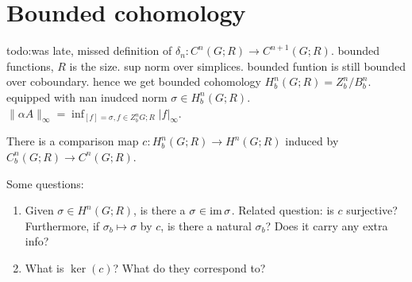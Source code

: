 \section{Bounded cohomology} 
{\color{red}todo:was late, missed definition of $\delta_n  \colon C^n (G;R)  \to C^{n+1}(G;R) $}. bounded functions, $R$ is the size.   sup norm over simplices. bounded funtion is still bounded over coboundary. hence we get bounded cohomology $H^n _b(G;R)=Z^n _b/ B^n _b.$ equipped with nan inudced norm $\sigma \in H^n _b(G;R)$. $\|\alpha A\|_{\infty}=\inf _{[f]=\sigma,f \in Z^n _b{G;R} }|f|_{\infty}$. 

\begin{definition}[]
    There is a comparison map $c \colon H^n _b(G;R) \to H^n (G;R)$ induced by $C^n _b(G;R) \to C^n (G;R)$.
\end{definition}
Some questions:
\begin{enumerate}[label=(\arabic*)]
\setlength\itemsep{-.2em}
    \item Given $\sigma \in H^n (G;R)$, is there a $\sigma \in \operatorname{im} \sigma$. Related question: is $c$ surjective? Furthermore, if $\sigma_b \mapsto  \sigma$ by $c$, is there a natural $\sigma_b$? Does it carry any extra info?
    \item What is $\ker(c)$? What do they correspond to?
\end{enumerate}

